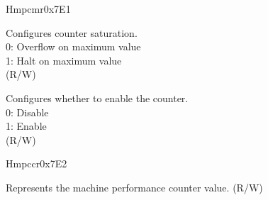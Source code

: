\begin{register}{H}{mpcmr}{0x7E1}\label{regdesc:MPCMR}
%
%
%
\regnewline%
\begin{regdesc}\begin{reglist}
\label{fielddesc:COUNTER_SATURATION}\item [COUNT\_SAT] Configures counter saturation.\\
0: Overflow on maximum value\\
1: Halt on maximum value\\
(R/W)
\label{fielddesc:COUNTER_ENABLE}\item [COUNT\_EN] Configures whether to enable the counter.\\
0: Disable\\
1: Enable\\
(R/W)
\end{reglist}\end{regdesc}
\end{register}

\begin{register}{H}{mpccr}{0x7E2}\label{regdesc:MPCCR}
%
\regnewline%
\begin{regdesc}\begin{reglist}
\label{fielddesc:MPCCR}\item [MPCCR] Represents the machine performance counter value. (R/W)
\end{reglist}\end{regdesc}
\end{register}
